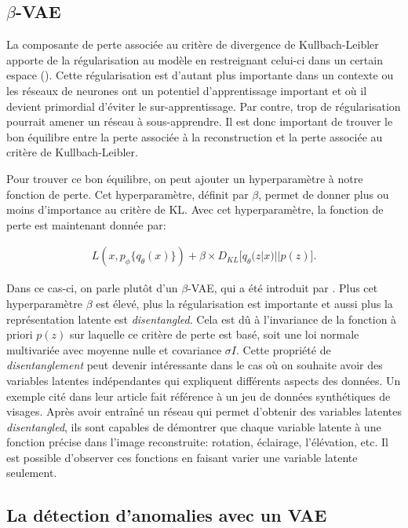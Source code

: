 \subsection{$\beta$-VAE}

La composante de perte associée au critère de divergence de Kullbach-Leibler apporte de la régularisation au modèle en restreignant celui-ci dans un certain espace (\cite{kingma2013autoencoding}). Cette régularisation est d'autant plus importante dans un contexte ou les réseaux de neurones ont un potentiel d'apprentissage important et où il devient primordial d'éviter le sur-apprentissage. Par contre, trop de régularisation pourrait amener un réseau à sous-apprendre. Il est donc important de trouver le bon équilibre entre la perte associée à la reconstruction et la perte associée au critère de Kullbach-Leibler.

Pour trouver ce bon équilibre, on peut ajouter un hyperparamètre à notre fonction de perte. Cet hyperparamètre, définit par $\beta$, permet de donner plus ou moins d'importance au critère de KL. Avec cet hyperparamètre, la fonction de perte est maintenant donnée par:

\begin{gather}  \label{eq:loss_betavae}
L(x, p_\phi\{q_\theta(x)\}) +  \beta \times D_{KL}\big[q_\theta(z|x) || p(z)\big].
\end{gather}

Dans ce cas-ci, on parle plutôt d'un $\beta$-VAE, qui a été introduit par \cite{Higgins2017betaVAELB}. Plus cet hyperparamètre $\beta$ est élevé, plus la régularisation est importante et aussi plus la représentation latente est \textit{disentangled}. Cela est dû à l'invariance de la fonction à priori $p(z)$ sur laquelle ce critère de perte est basé, soit une loi normale multivariée avec moyenne nulle et covariance $\sigma I$. Cette propriété de \textit{disentanglement} peut devenir intéressante dans le cas où on souhaite avoir des variables latentes indépendantes qui expliquent différents aspects des données. Un exemple cité dans leur article fait référence à un jeu de données synthétiques de visages. Après avoir entraîné un réseau qui permet d'obtenir des variables latentes \textit{disentangled}, ils sont capables de démontrer que chaque variable latente à une fonction précise dans l'image reconstruite: rotation, éclairage, l'élévation, etc. Il est possible d'observer ces fonctions en faisant varier une variable latente seulement.

\subsection{La détection d'anomalies avec un VAE}

